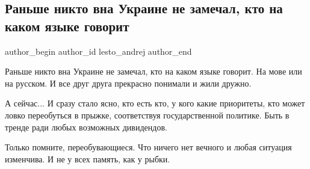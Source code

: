 
 
 
 
 
 
\subsection{Раньше никто вна Украине не замечал, кто на каком языке говорит}
\label{sec:01_08_2021.fb.lesto_andrej.1.vna_ukraine_mova}
 
\ifcmt
 author_begin
   author_id lesto_andrej
 author_end
\fi

Раньше никто вна Украине не замечал, кто на каком языке говорит. На мове или на
русском. И все друг друга прекрасно понимали и жили дружно.

А сейчас... И сразу стало ясно, кто есть кто, у кого какие приоритеты, кто
может ловко переобуться в прыжке, соответствуя государственной политике.  Быть
в тренде ради любых возможных дивидендов. 

Только помните, переобувающиеся. Что ничего нет вечного и любая ситуация
изменчива. И не у всех память, как у рыбки.

